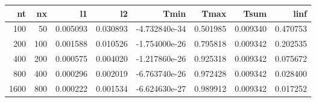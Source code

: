 \begin{tabular}{rrrrrrrr}
\toprule
   nt &   nx &        l1 &        l2 &          Tmin &      Tmax &      Tsum &      linf \\
\midrule
  100 &   50 &  0.005093 &  0.030893 & -4.732840e-34 &  0.501985 &  0.009340 &  0.470753 \\
  200 &  100 &  0.001588 &  0.010526 & -1.754000e-26 &  0.795818 &  0.009342 &  0.202535 \\
  400 &  200 &  0.000575 &  0.004020 & -1.217860e-26 &  0.925318 &  0.009342 &  0.075672 \\
  800 &  400 &  0.000296 &  0.002019 & -6.763740e-26 &  0.972428 &  0.009342 &  0.028400 \\
 1600 &  800 &  0.000222 &  0.001534 & -6.624630e-27 &  0.989912 &  0.009342 &  0.017252 \\
\bottomrule
\end{tabular}
